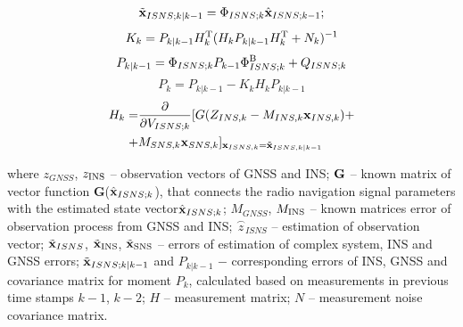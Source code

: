\documentclass[conference, utf8]{IEEEtran}
\begin{document}
\begin{equation} 
\begin{array}{l}
  \tilde{{\bf x}}_{ISNS;k|k-1} = \Phi_{ISNS;k} \hat{{\bf x}}_{ISNS;k-1} ; \\
  \end{array}
  \label{eq:k2} 
\end{equation} 
\begin{equation}
  K_{k} =P_{k|k-1} H_{k}^{{\rm T}} (H_{k} P_{k|k-1} H_{k}^{{\rm T}} +N_{k} )^{-1}
  \label{eq:k3}
\end{equation}
\begin{equation}
  P_{k|k-1} =\Phi_{ISNS;k} P_{k-1} \Phi_{ISNS;k}^{{\rm B}} +Q_{ISNS;k}
  \label{eq:k4}
\end{equation}
\begin{equation}
  P_{k} =P_{k|k-1} -K_{k} H_{k} P_{k|k-1}
  \label{eq:k5}
\end{equation}
\begin{equation}
  \begin{split}
  H_{k} = & \frac{\partial }{\partial V_{ISNS;k} } [G(Z_{INS,k} -M_{INS,k} {\bf x}_{INS,k} ) + \\
  + & M_{SNS, k}{\bf x}_{SNS, k}]_{{\bf x}_{ISNS, k} =\tilde{{\bf x}}_{ISNS, k|k-1} }
  \end{split}
\end{equation}


%
where $z_{GNSS} $, $z_{{\rm INS}}$ -- observation vectors of GNSS and INS; 
${\bf G}$ -- known matrix of vector function  \textbf{G}(\textbf{$\hat{{\bf x}}_{ISNS;k} $}),  
that connects the radio navigation signal parameters with the estimated state 
vector$\hat{{\bf x}}_{ISNS;k}$; 
$M_{GNSS}$, $M_{{\rm INS}}$  -- known matrices error of observation process from GNSS and INS; 
$\stackrel{\frown}{z}_{ISNS}$ -- estimation of observation vector; 
$\tilde{{\bf x}}_{ISNS} $, $\tilde{{\bf x}}_{{\rm INS}} $, $\tilde{{\bf x}}_{{\rm SNS}}$ -- errors of
estimation of complex system, INS and GNSS errors; 
$\tilde{{\bf x}}_{ISNS;k|k-1}$ and $P_{k|k-1} $ $-$ corresponding errors of INS, GNSS and 
covariance matrix for moment $P_{k}$, calculated based on measurements in previous 
time stamps $k-1$, $k-2$; $H$ -- measurement matrix; $N$ -- measurement noise covariance matrix.
\end{document}
